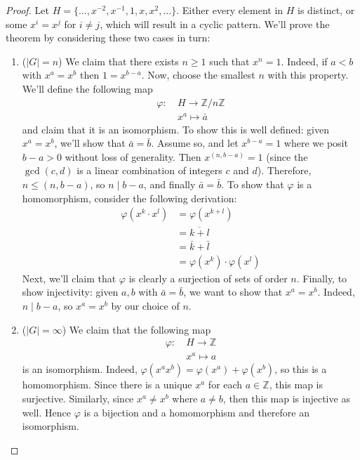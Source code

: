 \documentclass{article}
\theoremstyle{plain}
\newcommand{\Z}{\mathbb{Z}}
\begin{document}
\begin{proof}
Let $H = \{ \ldots, x^{-2}, x^{-1}, 1, x, x^2, \ldots \}$. Either every element in $H$ is distinct, or some $x^i = x^j$ for $i \ne j$, which will result in a cyclic pattern. We'll prove the theorem by considering these two cases in turn:
\begin{enumerate}
\item ($|G| = n$) We claim that there exists $n \ge 1$ such that $x^n = 1$. Indeed, if $a < b$ with $x^a = x^b$ then $1=x^{b-a}$. Now, choose the smallest $n$ with this property. We'll define the following map
\begin{align*}
\varphi : \ &H \to \Z/n\Z \\
&x^a \mapsto \bar{a}
\end{align*}
and claim that it is an isomorphism. To show this is well defined: given $x^a = x^b$, we'll show that $\bar{a} = \bar{b}$. Assume so, and let $x^{b-a} = 1$ where we posit $b-a > 0$ without loss of generality. Then $x^{(n,b-a)} = 1$ (since the $\gcd(c,d)$ is a linear combination of integers $c$ and $d$). Therefore, $n \le (n,b-a)$, so $n\mid b-a$, and finally $\bar{a} = \bar{b}$. To show that $\varphi$ is a homomorphism, consider the following derivation:
\begin{align*}
\varphi(x^k\cdot x^l) &= \varphi(x^{k+l}) \\
&= \overline{k+l} \\
&= \bar{k} + \bar{l} \\
&= \varphi(x^k)\cdot \varphi(x^l)
\end{align*}
Next, we'll claim that $\varphi$ is clearly a surjection of sets of order $n$. Finally, to show injectivity: given $a,b$ with $\bar{a} = \bar{b}$, we want to show that $x^a = x^b$. Indeed, $n\mid b-a$, so $x^a = x^b$ by our choice of $n$.

\item ($|G| = \infty$) We claim that the following map
\begin{align*}
\varphi : \ &H \to \Z \\
&x^a \mapsto a
\end{align*}
is an isomorphism. Indeed, $\varphi(x^ax^b) = \varphi(x^a) + \varphi(x^b)$, so this is a homomorphism. Since there is a unique $x^a$ for each $a\in\Z$, this map is surjective. Similarly, since $x^a \ne x^b$ where $a \ne b$, then this map is injective as well. Hence $\varphi$ is a bijection and a homomorphism and therefore an isomorphism.
\end{enumerate}
\end{proof}
\end{document}

